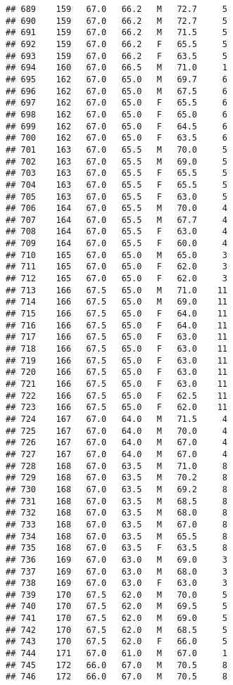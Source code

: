 \documentclass[
]{article}
\begin{document}
\begin{verbatim}
## 689    159   67.0   66.2   M   72.7     5
## 690    159   67.0   66.2   M   72.7     5
## 691    159   67.0   66.2   M   71.5     5
## 692    159   67.0   66.2   F   65.5     5
## 693    159   67.0   66.2   F   63.5     5
## 694    160   67.0   66.5   M   71.0     1
## 695    162   67.0   65.0   M   69.7     6
## 696    162   67.0   65.0   M   67.5     6
## 697    162   67.0   65.0   F   65.5     6
## 698    162   67.0   65.0   F   65.0     6
## 699    162   67.0   65.0   F   64.5     6
## 700    162   67.0   65.0   F   63.5     6
## 701    163   67.0   65.5   M   70.0     5
## 702    163   67.0   65.5   M   69.0     5
## 703    163   67.0   65.5   F   65.5     5
## 704    163   67.0   65.5   F   65.5     5
## 705    163   67.0   65.5   F   63.0     5
## 706    164   67.0   65.5   M   70.0     4
## 707    164   67.0   65.5   M   67.7     4
## 708    164   67.0   65.5   F   63.0     4
## 709    164   67.0   65.5   F   60.0     4
## 710    165   67.0   65.0   M   65.0     3
## 711    165   67.0   65.0   F   62.0     3
## 712    165   67.0   65.0   F   62.0     3
## 713    166   67.5   65.0   M   71.0    11
## 714    166   67.5   65.0   M   69.0    11
## 715    166   67.5   65.0   F   64.0    11
## 716    166   67.5   65.0   F   64.0    11
## 717    166   67.5   65.0   F   63.0    11
## 718    166   67.5   65.0   F   63.0    11
## 719    166   67.5   65.0   F   63.0    11
## 720    166   67.5   65.0   F   63.0    11
## 721    166   67.5   65.0   F   63.0    11
## 722    166   67.5   65.0   F   62.5    11
## 723    166   67.5   65.0   F   62.0    11
## 724    167   67.0   64.0   M   71.5     4
## 725    167   67.0   64.0   M   70.0     4
## 726    167   67.0   64.0   M   67.0     4
## 727    167   67.0   64.0   M   67.0     4
## 728    168   67.0   63.5   M   71.0     8
## 729    168   67.0   63.5   M   70.2     8
## 730    168   67.0   63.5   M   69.2     8
## 731    168   67.0   63.5   M   68.5     8
## 732    168   67.0   63.5   M   68.0     8
## 733    168   67.0   63.5   M   67.0     8
## 734    168   67.0   63.5   M   65.5     8
## 735    168   67.0   63.5   F   63.5     8
## 736    169   67.0   63.0   M   69.0     3
## 737    169   67.0   63.0   M   68.0     3
## 738    169   67.0   63.0   F   63.0     3
## 739    170   67.5   62.0   M   70.0     5
## 740    170   67.5   62.0   M   69.5     5
## 741    170   67.5   62.0   M   69.0     5
## 742    170   67.5   62.0   M   68.5     5
## 743    170   67.5   62.0   F   66.0     5
## 744    171   67.0   61.0   M   67.0     1
## 745    172   66.0   67.0   M   70.5     8
## 746    172   66.0   67.0   M   70.5     8

\end{verbatim}
\end{document}
